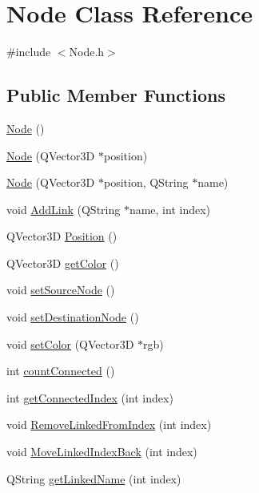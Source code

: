 \hypertarget{class_node}{}\section{Node Class Reference}
\label{class_node}


{\ttfamily \#include $<$Node.\+h$>$}

\subsection*{Public Member Functions}
\begin{DoxyCompactItemize}
\item 
\hyperlink{class_node_ad7a34779cad45d997bfd6d3d8043c75f}{Node} ()
\item 
\hyperlink{class_node_a05ed049c8f67c70fcece299a897ab6b5}{Node} (Q\+Vector3\+D $\ast$position)
\item 
\hyperlink{class_node_a7ec8a9c8ebda58b1f1471b384a0d3e65}{Node} (Q\+Vector3\+D $\ast$position, Q\+String $\ast$name)
\item 
void \hyperlink{class_node_a17bc52bf62fda176a1c248f99cfb3886}{Add\+Link} (Q\+String $\ast$name, int index)
\item 
Q\+Vector3\+D \hyperlink{class_node_a3caaebc00e5a3e61109a70b225cede3e}{Position} ()
\item 
Q\+Vector3\+D \hyperlink{class_node_af5c585a95a70f9164c717a01898140e7}{get\+Color} ()
\item 
void \hyperlink{class_node_ace44981a431b4ddb13dff2f867be6fc1}{set\+Source\+Node} ()
\item 
void \hyperlink{class_node_a44974fbab25f8a5050bf21f67fe58cb1}{set\+Destination\+Node} ()
\item 
void \hyperlink{class_node_a866aa8eddf47f84b17cd1fa7ef6dfaf6}{set\+Color} (Q\+Vector3\+D $\ast$rgb)
\item 
int \hyperlink{class_node_a38c96d5711f26f65ff7a963e6c8b00a0}{count\+Connected} ()
\item 
int \hyperlink{class_node_ae13b17e3c0feddc1ed05ed34607d7e27}{get\+Connected\+Index} (int index)
\item 
void \hyperlink{class_node_ab58a47fbce1b76993a8173ec7692b6d6}{Remove\+Linked\+From\+Index} (int index)
\item 
void \hyperlink{class_node_a213dfc6da9a1762098a9267a48e7833d}{Move\+Linked\+Index\+Back} (int index)
\item 
Q\+String \hyperlink{class_node_a4f06a1ae2ca3552ccc9e444960d43372}{get\+Linked\+Name} (int index)

\end{DoxyCompactItemize}
